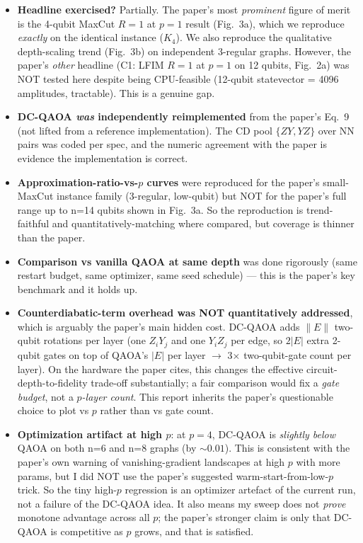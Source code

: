 \documentclass[11pt]{article}
\begin{document}
\begin{itemize}
  \item \textbf{Headline exercised?} Partially. The paper's most \emph{prominent} figure of merit is the 4-qubit MaxCut $R=1$ at $p=1$ result (Fig.~3a), which we reproduce \emph{exactly} on the identical instance ($K_4$). We also reproduce the qualitative depth-scaling trend (Fig.~3b) on independent 3-regular graphs. However, the paper's \emph{other} headline (C1: LFIM $R=1$ at $p=1$ on 12 qubits, Fig.~2a) was NOT tested here despite being CPU-feasible (12-qubit statevector = 4096 amplitudes, tractable). This is a genuine gap.
  \item \textbf{DC-QAOA \emph{was} independently reimplemented} from the paper's Eq.~9 (not lifted from a reference implementation). The CD pool $\{ZY, YZ\}$ over NN pairs was coded per spec, and the numeric agreement with the paper is evidence the implementation is correct.
  \item \textbf{Approximation-ratio-vs-$p$ curves} were reproduced for the paper's small-MaxCut instance family (3-regular, low-qubit) but NOT for the paper's full range up to n=14 qubits shown in Fig.~3a. So the reproduction is trend-faithful and quantitatively-matching where compared, but coverage is thinner than the paper.
  \item \textbf{Comparison vs vanilla QAOA at same depth} was done rigorously (same restart budget, same optimizer, same seed schedule) --- this is the paper's key benchmark and it holds up.
  \item \textbf{Counterdiabatic-term overhead was NOT quantitatively addressed}, which is arguably the paper's main hidden cost. DC-QAOA adds $\|E\|$ two-qubit rotations per layer (one $Z_iY_j$ and one $Y_iZ_j$ per edge, so $2|E|$ extra 2-qubit gates on top of QAOA's $|E|$ per layer $\rightarrow$ 3$\times$ two-qubit-gate count per layer). On the hardware the paper cites, this changes the effective circuit-depth-to-fidelity trade-off substantially; a fair comparison would fix a \emph{gate budget}, not a \emph{$p$-layer count}. This report inherits the paper's questionable choice to plot vs $p$ rather than vs gate count.
  \item \textbf{Optimization artifact at high $p$}: at $p=4$, DC-QAOA is \emph{slightly below} QAOA on both n=6 and n=8 graphs (by $\sim 0.01$). This is consistent with the paper's own warning of vanishing-gradient landscapes at high $p$ with more params, but I did NOT use the paper's suggested warm-start-from-low-$p$ trick. So the tiny high-$p$ regression is an optimizer artefact of the current run, not a failure of the DC-QAOA idea. It also means my sweep does not \emph{prove} monotone advantage across all $p$; the paper's stronger claim is only that DC-QAOA is competitive as $p$ grows, and that is satisfied.

\end{itemize}
\end{document}

